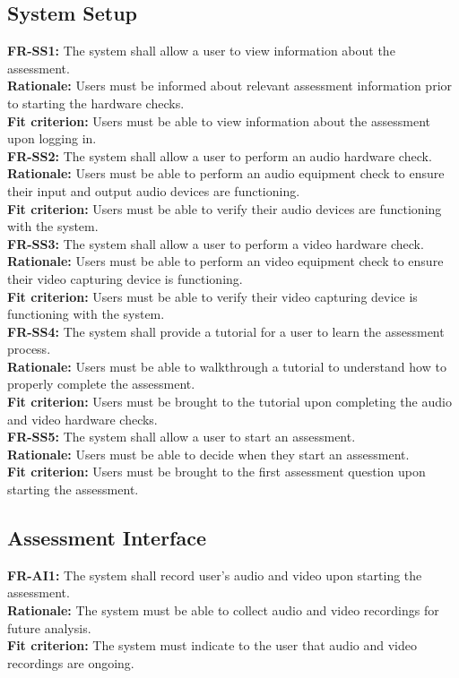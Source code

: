 \documentclass[12pt]{article}
\begin{document}
\subsection{System Setup}
\textbf{FR-SS1: }The system shall allow a user to view information about the assessment.\\
\textbf{Rationale: }Users must be informed about relevant assessment information prior to starting the hardware checks.\\
\textbf{Fit criterion: }Users must be able to view information about the assessment upon logging in.\\

\textbf{FR-SS2: }The system shall allow a user to perform an audio hardware check.\\
\textbf{Rationale: }Users must be able to perform an audio equipment check to ensure their input and output audio devices are functioning.\\
\textbf{Fit criterion: }Users must be able to verify their audio devices are functioning with the system.\\

\textbf{FR-SS3: }The system shall allow a user to perform a video hardware check.\\
\textbf{Rationale: }Users must be able to perform an video equipment check to ensure their video capturing device is functioning.\\
\textbf{Fit criterion: }Users must be able to verify their video capturing device is functioning with the system.\\

\textbf{FR-SS4: }The system shall provide a tutorial for a user to learn the assessment process.\\
\textbf{Rationale: }Users must be able to walkthrough a tutorial to understand how to properly complete the assessment.\\
\textbf{Fit criterion: }Users must be brought to the tutorial upon completing the audio and video hardware checks.\\

\textbf{FR-SS5: }The system shall allow a user to start an assessment.\\
\textbf{Rationale: }Users must be able to decide when they start an assessment.\\
\textbf{Fit criterion: }Users must be brought to the first assessment question upon starting the assessment.\\

\subsection{Assessment Interface}
\textbf{FR-AI1: }The system shall record user's audio and video upon starting the assessment.\\
\textbf{Rationale: }The system must be able to collect audio and video recordings for future analysis.\\
\textbf{Fit criterion: }The system must indicate to the user that audio and video recordings are ongoing.\\
\end{document}
